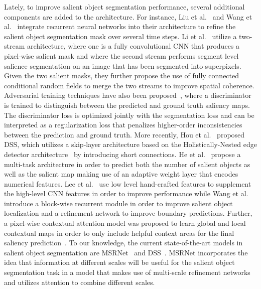 \documentclass[journal]{IEEEtran}
\begin{document}
Lately, to improve salient object segmentation performance, several additional components are added to the architecture. For instance, Liu et al.~\cite{liu2016dhsnet} and Wang et al.~\cite{wang2016saliency} integrate recurrent neural networks into their architecture to refine the salient object segmentation mask over several time steps. Li et al.~\cite{li2016deep} utilize a two-stream architecture, where one is a fully convolutional CNN that produces a pixel-wise salient mask and where the second stream performs segment level salience segmentation on an image that has been segmented into superpixels. Given the two salient masks, they further propose the use of fully connected conditional random fields to merge the two streams to improve spatial coherence. Adversarial training techniques have also been proposed~\cite{pan2017salgan,pan2017supervised}, where a discriminator is trained to distinguish between the predicted and ground truth saliency maps. The discriminator loss is optimized jointly with the segmentation loss and can be interpreted as a regularization loss that penalizes higher-order inconsistencies between the prediction and ground truth. More recently, Hou et al.~\cite{hou2018deeply} proposed DSS, which utilizes a skip-layer architecture based on the Holistically-Nested edge detector architecture~\cite{xie2015holistically} by introducing short connections. He et al.~\cite{He_2017_ICCV} propose a multi-task architecture in order to predict both the number of salient objects as well as the salient map making use of an adaptive weight layer that encodes numerical features. Lee et al.~\cite{lee2018eld} use low level hand-crafted features to supplement the high-level CNN features in order to improve performance while Wang et al.~\cite{Wang_2018_CVPR} introduce a block-wise recurrent module in order to improve salient object localization and a refinement network to improve boundary predictions. Further, a pixel-wise contextual attention model was proposed to learn global and local contextual maps in order to only include helpful context areas for the final saliency prediction~\cite{Liu_2018_CVPR}.
To our knowledge, the current state-of-the-art models in salient object segmentation are MSRNet~\cite{li2017instance} and DSS~\cite{hou2018deeply}. MSRNet incorporates the idea that information at different scales will be useful for the salient object segmentation task in a model that makes use of multi-scale refinement networks and utilizes attention to combine different scales.
\end{document}

